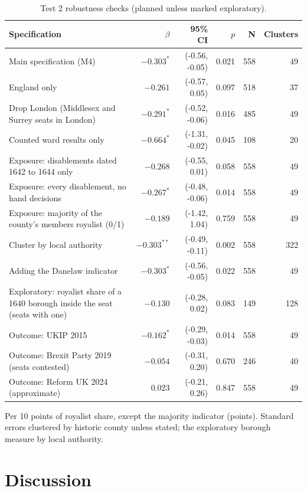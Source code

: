 \documentclass[11pt,a4paper]{article}
\begin{document}
\begin{table}[tbp]\centering\scriptsize\caption{Test 2 robustness checks (planned unless marked exploratory).}\label{tab:rob2}\begin{tabular}{p{7.4cm}rrrrr}\toprule Specification & $\beta$ & 95\% CI & $p$ & N & Clusters\\\midrule
Main specification (M4) & $-0.303^{*}$ & (-0.56, -0.05) & 0.021 & 558 & 49\\
England only & $-0.261$ & (-0.57, 0.05) & 0.097 & 518 & 37\\
Drop London (Middlesex and Surrey seats in London) & $-0.291^{*}$ & (-0.52, -0.06) & 0.016 & 485 & 49\\
Counted ward results only & $-0.664^{*}$ & (-1.31, -0.02) & 0.045 & 108 & 20\\
Exposure: disablements dated 1642 to 1644 only & $-0.268$ & (-0.55, 0.01) & 0.058 & 558 & 49\\
Exposure: every disablement, no hand decisions & $-0.267^{*}$ & (-0.48, -0.06) & 0.014 & 558 & 49\\
Exposure: majority of the county's members royalist (0/1) & $-0.189$ & (-1.42, 1.04) & 0.759 & 558 & 49\\
Cluster by local authority & $-0.303^{**}$ & (-0.49, -0.11) & 0.002 & 558 & 322\\
Adding the Danelaw indicator & $-0.303^{*}$ & (-0.56, -0.05) & 0.022 & 558 & 49\\
Exploratory: royalist share of a 1640 borough inside the seat (seats with one) & $-0.130$ & (-0.28, 0.02) & 0.083 & 149 & 128\\
Outcome: UKIP 2015 & $-0.162^{*}$ & (-0.29, -0.03) & 0.014 & 558 & 49\\
Outcome: Brexit Party 2019 (seats contested) & $-0.054$ & (-0.31, 0.20) & 0.670 & 246 & 40\\
Outcome: Reform UK 2024 (approximate) & $0.023$ & (-0.21, 0.26) & 0.847 & 558 & 49\\
\bottomrule\end{tabular}\par\vspace{0.3em}\parbox{0.92\textwidth}{\scriptsize Per 10 points of royalist share, except the majority indicator (points). Standard errors clustered by historic county unless stated; the exploratory borough measure by local authority.}\end{table}

\section{Discussion}\label{sec:disc}
\end{document}
